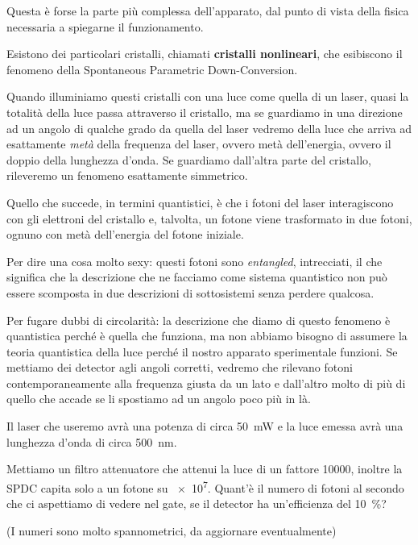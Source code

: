 \documentclass{article}
\begin{document}
Questa è forse la parte più complessa dell'apparato, dal punto di vista della fisica necessaria a spiegarne il funzionamento.

Esistono dei particolari cristalli, chiamati \textbf{cristalli nonlineari}, che esibiscono il fenomeno della Spontaneous Parametric Down-Conversion.

Quando illuminiamo questi cristalli con una luce come quella di un laser, quasi la totalità della luce passa attraverso il cristallo, ma se guardiamo in una direzione ad un angolo di qualche grado da quella del laser vedremo della luce che arriva ad esattamente \emph{metà} della frequenza del laser, ovvero metà dell'energia, ovvero il doppio della lunghezza d'onda. 
Se guardiamo dall'altra parte del cristallo, rileveremo un fenomeno esattamente simmetrico.

Quello che succede, in termini quantistici, è che i fotoni del laser interagiscono con gli elettroni del cristallo e, talvolta, un fotone viene trasformato in due fotoni, ognuno con metà dell'energia del fotone iniziale.

Per dire una cosa molto sexy: questi fotoni sono \emph{entangled}, intrecciati, il che significa che la descrizione che ne facciamo come sistema quantistico non può essere scomposta in due descrizioni di sottosistemi senza perdere qualcosa. 

Per fugare dubbi di circolarità: la descrizione che diamo di questo fenomeno è quantistica perché è quella che funziona, ma non abbiamo bisogno di assumere la teoria quantistica della luce perché il nostro apparato sperimentale funzioni.
Se mettiamo dei detector agli angoli corretti, vedremo che rilevano fotoni contemporaneamente alla frequenza giusta da un lato e dall'altro molto di più di quello che accade se li spostiamo ad un angolo poco più in là. 

\begin{exo}
Il laser che useremo avrà una potenza di circa \SI{50}{mW} e la luce emessa avrà una lunghezza d'onda di circa \SI{500}{nm}. 

Mettiamo un filtro attenuatore che attenui la luce di un fattore 10000, inoltre la SPDC capita solo a un fotone su \num{e7}. Quant'è il numero di fotoni al secondo che ci aspettiamo di vedere nel gate, se il detector ha un'efficienza del \SI{10}{\percent}?

(I numeri sono molto spannometrici, da aggiornare eventualmente)
\end{exo}
\end{document}
